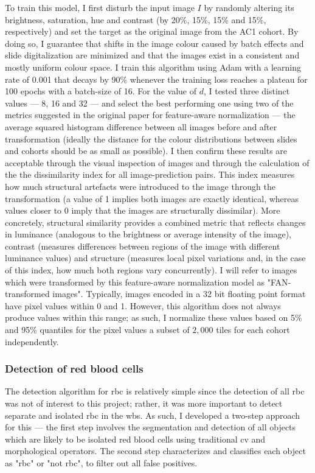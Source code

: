 To train this model, I first disturb the input image $I$ by randomly altering its brightness, saturation, hue and contrast (by 20\%, 15\%, 15\% and 15\%, respectively) and set the target as the original image from the AC1 cohort. By doing so, I guarantee that shifts in the image colour caused by batch effects and slide digitalization are minimized and that the images exist in a consistent and mostly uniform colour space. I train this algorithm using Adam with a learning rate of 0.001 that decays by 90\% whenever the training loss reaches a plateau for 100 epochs with a batch-size of 16. For the value of $d$, I tested three distinct values --- 8, 16 and 32 --- and select the best performing one using two of the metrics suggested in the original paper for feature-aware normalization \cite{Bug2017-kk} --- the average squared histogram difference between all images before and after transformation (ideally the distance for the colour distributions between slides and cohorts should be as small as possible). I then confirm these results are acceptable through the visual inspection of images and through the calculation of the the dissimilarity index \cite{Wang2004-sl} for all image-prediction pairs. This index measures how much structural artefacts were introduced to the image through the transformation (a value of 1 implies both images are exactly identical, whereas values closer to 0 imply that the images are structurally dissimilar). More concretely, structural similarity provides a combined metric that reflects changes in luminance (analogous to the brightness or average intensity of the image), contrast (measures differences between regions of the image with different luminance values) and structure (measures local pixel variations and, in the case of this index, how much both regions vary concurrently). I will refer to images which were transformed by this feature-aware normalization model as "FAN-transformed images". Typically, images encoded in a 32 bit floating point format have pixel values within 0 and 1. However, this algorithm does not always produce values within this range; as such, I normalize these values based on 5\% and 95\% quantiles for the pixel values a subset of $2,000$ tiles for each cohort independently.  

\subsubsection{Detection of red blood cells}

The detection algorithm for \ac{rbc} is relatively simple since the detection of all \ac{rbc} was not of interest to this project; rather, it was more important to detect separate and isolated \ac{rbc} in the \ac{wbs}. As such, I developed a two-step approach for this --- the first step involves the segmentation and detection of all objects which are likely to be isolated red blood cells using traditional \ac{cv} and morphological operators. The second step characterizes and classifies each object as "\ac{rbc}" or "not \ac{rbc}", to filter out all false positives.

